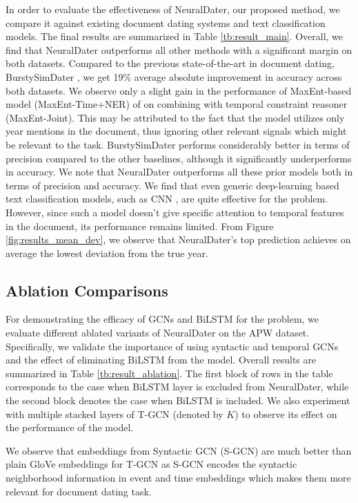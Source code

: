 \documentclass[11pt,a4paper]{article}
\newcommand{\reffig}[1]{Figure \ref{#1}}
\newcommand{\method}{NeuralDater}
\begin{document}
In order to evaluate the effectiveness of \method{}, our proposed method, we compare it against existing document dating systems and text classification models. The final results are summarized in Table \ref{tb:result_main}. Overall, we find that \method{} outperforms all other methods with a significant margin on both datasets. Compared to the previous state-of-the-art in document dating, BurstySimDater  \cite{Kotsakos:2014:BAD:2600428.2609495}, we get 19\% average absolute improvement in accuracy across both datasets. We observe only a slight gain in the performance of MaxEnt-based model (MaxEnt-Time+NER) of \cite{Chambers:2012:LDT:2390524.2390539} on combining with temporal constraint reasoner (MaxEnt-Joint). This may be attributed to the fact that the model utilizes only year mentions in the document, thus ignoring other relevant signals which might be relevant to the task. BurstySimDater performs considerably better in terms of precision compared to the other baselines,  although it significantly underperforms in accuracy. We note that NeuralDater outperforms all these prior models both in terms of precision and accuracy. We find that even generic deep-learning based text classification models, such as CNN \cite{yoon_kim}, are quite effective for the problem. However, since such a model doesn't give specific attention to temporal features in the document, its performance remains limited. From \reffig{fig:results_mean_dev}, we observe that \method{}'s top prediction achieves on average the lowest deviation from the true year.

\subsection{Ablation Comparisons}
\label{sec:ablation}

For demonstrating the efficacy of GCNs and BiLSTM for the problem, we evaluate different ablated variants of \method{} on the APW dataset. Specifically, we validate the importance of using syntactic and temporal GCNs and the effect of eliminating BiLSTM from the model. Overall results are summarized in Table \ref{tb:result_ablation}. The first block of rows in the table corresponds to the case when BiLSTM layer is excluded from \method{}, while the second block denotes the case when BiLSTM is included. We also experiment with multiple stacked layers of T-GCN (denoted by $K$) to observe its effect on the performance of the model. 

We observe that embeddings from Syntactic GCN (S-GCN) are much better than plain GloVe embeddings for T-GCN as S-GCN encodes the syntactic neighborhood information in event and time embeddings which makes them more relevant for document dating task.
\end{document}
